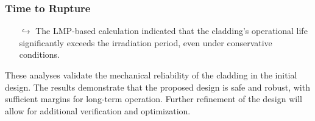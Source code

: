 \subsubsection{Time to Rupture}
\begin{itemize}
    \item[$\hookrightarrow$] The LMP-based calculation indicated that the cladding's operational life significantly exceeds the irradiation period, even under conservative conditions.
\end{itemize}

These analyses validate the mechanical reliability of the cladding in the initial design. The results demonstrate that the proposed design is safe and robust, with sufficient margins for long-term operation. Further refinement of the design will allow for additional verification and optimization.

